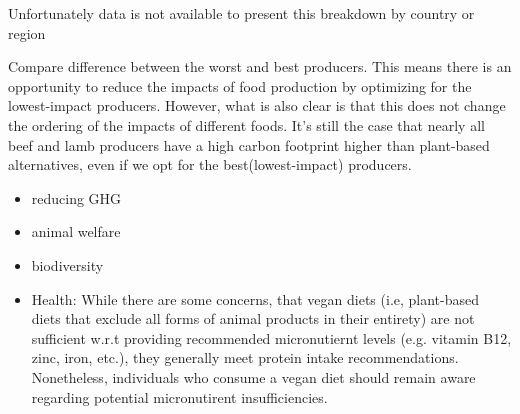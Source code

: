 \documentclass{article}
\begin{document}
Unfortunately data is not available to present this breakdown by country or region

Compare difference between the worst and best producers. This means there is an opportunity to reduce the impacts of food production by optimizing for the lowest-impact producers. However, what is also clear is that this does not change the ordering of the impacts of different foods. It's still the case that nearly all beef and lamb producers have a high carbon footprint higher than plant-based alternatives, even if we opt for the best(lowest-impact) producers.
\begin{itemize}
  \item reducing GHG
  \item animal welfare
  \item biodiversity
  \item Health: While there are some concerns, that vegan diets (i.e, plant-based diets that exclude all forms of animal products in their entirety) are not sufficient w.r.t providing recommended micronutiernt levels (e.g. vitamin B12, zinc, iron, etc.), they generally meet protein intake recommendations. Nonetheless, individuals who consume a vegan diet should remain aware regarding potential micronutirent insufficiencies. 
  \end{itemize}
  
{\small


}
\end{document}
